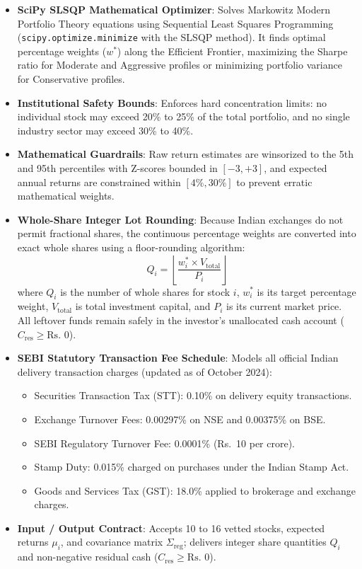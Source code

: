 \begin{itemize}
    \item \textbf{SciPy SLSQP Mathematical Optimizer}: Solves Markowitz Modern Portfolio Theory equations using Sequential Least Squares Programming (\texttt{scipy.optimize.minimize} with the SLSQP method). It finds optimal percentage weights ($w^*$) along the Efficient Frontier, maximizing the Sharpe ratio for Moderate and Aggressive profiles or minimizing portfolio variance for Conservative profiles.
    \item \textbf{Institutional Safety Bounds}: Enforces hard concentration limits: no individual stock may exceed 20\% to 25\% of the total portfolio, and no single industry sector may exceed 30\% to 40\%.
    \item \textbf{Mathematical Guardrails}: Raw return estimates are winsorized to the 5th and 95th percentiles with Z-scores bounded in $[-3, +3]$, and expected annual returns are constrained within $[4\%, 30\%]$ to prevent erratic mathematical weights.
    \item \textbf{Whole-Share Integer Lot Rounding}: Because Indian exchanges do not permit fractional shares, the continuous percentage weights are converted into exact whole shares using a floor-rounding algorithm:
    \begin{equation}
        Q_i = \left\lfloor \frac{w_i^* \times V_{\text{total}}}{P_i} \right\rfloor
    \end{equation}
    where $Q_i$ is the number of whole shares for stock $i$, $w_i^*$ is its target percentage weight, $V_{\text{total}}$ is total investment capital, and $P_i$ is its current market price. All leftover funds remain safely in the investor's unallocated cash account ($C_{\text{res}} \ge \text{Rs.~}0$).
    \item \textbf{SEBI Statutory Transaction Fee Schedule}: Models all official Indian delivery transaction charges (updated as of October 2024):
    \begin{itemize}
        \item Securities Transaction Tax (STT): 0.10\% on delivery equity transactions.
        \item Exchange Turnover Fees: 0.00297\% on NSE and 0.00375\% on BSE.
        \item SEBI Regulatory Turnover Fee: 0.0001\% (Rs.~10 per crore).
        \item Stamp Duty: 0.015\% charged on purchases under the Indian Stamp Act.
        \item Goods and Services Tax (GST): 18.0\% applied to brokerage and exchange charges.
    \end{itemize}
    \item \textbf{Input / Output Contract}: Accepts 10 to 16 vetted stocks, expected returns $\mu_i$, and covariance matrix $\Sigma_{\text{reg}}$; delivers integer share quantities $Q_i$ and non-negative residual cash ($C_{\text{res}} \ge \text{Rs.~}0$).
\end{itemize}

